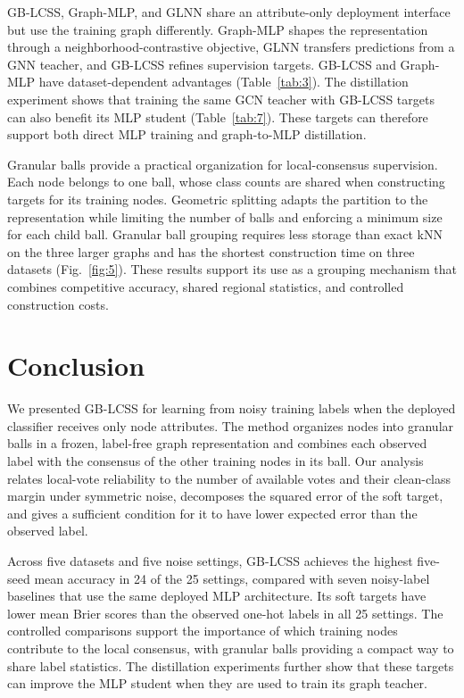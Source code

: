 \documentclass[times,review,10pt]{elsarticle}
\theoremstyle{definition}
\theoremstyle{plain}
\begin{document}
GB-LCSS, Graph-MLP, and GLNN share an attribute-only deployment interface but use the training graph differently. Graph-MLP shapes the representation through a neighborhood-contrastive objective, GLNN transfers predictions from a GNN teacher, and GB-LCSS refines supervision targets. GB-LCSS and Graph-MLP have dataset-dependent advantages (Table~\ref{tab:3}). The distillation experiment shows that training the same GCN teacher with GB-LCSS targets can also benefit its MLP student (Table~\ref{tab:7}). These targets can therefore support both direct MLP training and graph-to-MLP distillation.

Granular balls provide a practical organization for local-consensus supervision. Each node belongs to one ball, whose class counts are shared when constructing targets for its training nodes. Geometric splitting adapts the partition to the representation while limiting the number of balls and enforcing a minimum size for each child ball. Granular ball grouping requires less storage than exact kNN on the three larger graphs and has the shortest construction time on three datasets (Fig.~\ref{fig:5}). These results support its use as a grouping mechanism that combines competitive accuracy, shared regional statistics, and controlled construction costs.

\section{Conclusion}\label{sec:5}

We presented GB-LCSS for learning from noisy training labels when the deployed classifier receives only node attributes. The method organizes nodes into granular balls in a frozen, label-free graph representation and combines each observed label with the consensus of the other training nodes in its ball. Our analysis relates local-vote reliability to the number of available votes and their clean-class margin under symmetric noise, decomposes the squared error of the soft target, and gives a sufficient condition for it to have lower expected error than the observed label.

Across five datasets and five noise settings, GB-LCSS achieves the highest five-seed mean accuracy in 24 of the 25 settings, compared with seven noisy-label baselines that use the same deployed MLP architecture. Its soft targets have lower mean Brier scores than the observed one-hot labels in all 25 settings. The controlled comparisons support the importance of which training nodes contribute to the local consensus, with granular balls providing a compact way to share label statistics. The distillation experiments further show that these targets can improve the MLP student when they are used to train its graph teacher.
\end{document}
